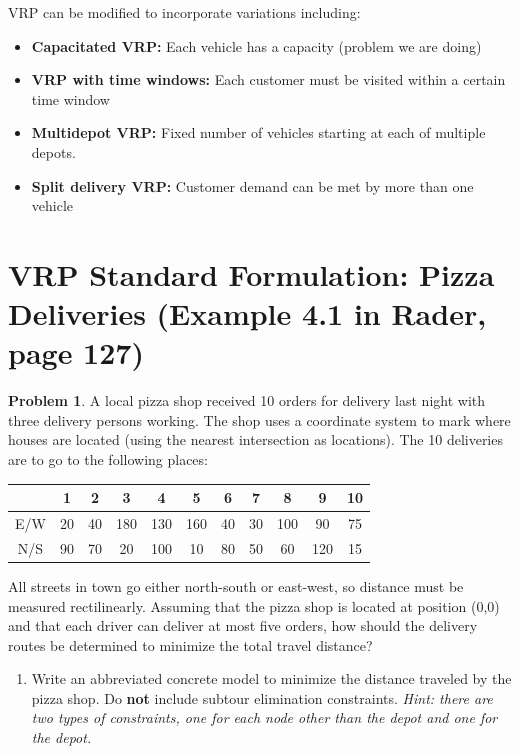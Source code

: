 \documentclass[11pt]{article}
\theoremstyle{definition}
\newtheorem{problem}{Problem}
\begin{document}
VRP can be modified to incorporate variations including:
\begin{itemize}
\item \textbf{Capacitated VRP:} Each vehicle has a capacity (problem we are doing)
\item \textbf{VRP with time windows:}  Each customer must be visited within a certain time window
\item \textbf{Multidepot VRP:}  Fixed number of vehicles starting at each of multiple depots. 
\item \textbf{Split delivery VRP: } Customer demand can be met by more than one vehicle
\end{itemize}

\newpage

\section{VRP Standard Formulation: Pizza Deliveries (Example 4.1 in Rader, page 127)}

\begin{problem}
A local pizza shop received 10 orders for delivery last night with three delivery persons working.  The shop uses a coordinate system to
mark where houses are located (using the nearest intersection as locations).  The
10 deliveries are to go to the following places:

\begin{center}
\begin{tabular}{|c|c|c|c|c|c|c|c|c|c|c|}
\hline
& 1 & 2 & 3 & 4 & 5 & 6 & 7 & 8 & 9 & 10  \\
\hline
E/W & 20 & 40 & 180 & 130 & 160 & 40 & 30 & 100 & 90 & 75 \\
\hline
N/S & 90 & 70 & 20 & 100 & 10 & 80 & 50 & 60 & 120 & 15 \\
\hline
\end{tabular}
\end{center}

All streets in town go either north-south or east-west, so distance must be
measured rectilinearly.  Assuming that the pizza shop is located at position (0,0)
and that each driver can deliver at most five orders, how should the delivery
routes be determined to minimize the total travel distance? 
\end{problem}

\begin{enumerate}
\item Write an abbreviated concrete model to minimize the distance traveled by the pizza shop. Do \textbf{not} include subtour elimination constraints. \emph{Hint: there are two types of constraints, one for each node other than the depot and one for the depot.}
\end{enumerate}
\end{document}
